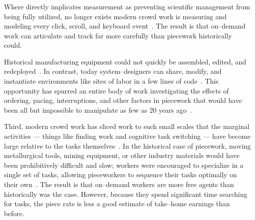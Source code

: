 \documentclass[trackingWork]{subfiles}
\begin{document}
\onlyinsubfile{\clearpage}
\subsubsection{\whatchanged}
\begin{comment}
outline
	- measurement is more precise,
  so decomposition is deeper
	- not a single position,
  but a marketplace
\end{comment}

Where \citeauthor{10.2307/23702539} directly implicates measurement as
preventing scientific management from being fully utilized,
no longer exists
modern crowd work is measuring and modeling every click,
scroll,
and keyboard event~\cite{rzeszotarski2011instrumenting,rzeszotarski2012crowdscape}.
The result is that on--demand work can articulate and track far more carefully than piecework historically could.

Historical manufacturing equipment could not quickly be assembled,
edited,
and redeployed~\cite{hu1961parallel}.
In contrast,
today system--designers can share,
modify,
and instantiate environments
like sites of labor in a few lines of code~\cite{lessig2006code,turkitLittle}.
This opportunity has spurred an entire body of work investigating the effects of
ordering,
pacing,
interruptions,
and
other factors in piecework that would have been
all but impossible to manipulate as few as 20 years ago~\cite{dai2015and,Cai:2016:CRI:2858036.2858237,cheng2015break,measuringCrowdsourcingCheng,embracingErrorKrishna}.
 
Third,
modern crowd work has sliced work to such small scales that the marginal activities
--- things like finding work and cognitive task switching ---
have become large relative to the tasks themselves~\cite{taskSearch}.
In the historical case of piecework,
moving metallurgical tools,
mining equipment,
or
other industry materials would have been prohibitively difficult and slow;
workers were encouraged to specialize in a single set of tasks,
allowing pieceworkers to sequence their tasks optimally on their own~\cite{hart2013rise}.
The result is that on--demand workers are more free agents than historically was the case.
However,
because they spend significant time searching for tasks,
the piece rate is less a good estimate of take--home earnings than before.
\end{document}
